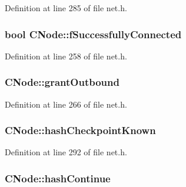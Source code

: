 Definition at line 285 of file net.\+h.

\hypertarget{class_c_node_ab58c1772b2698e348d86002f34254119}{}
\subsubsection[{f\+Successfully\+Connected}]{\setlength{\rightskip}{0pt plus 5cm}bool C\+Node\+::f\+Successfully\+Connected}\label{class_c_node_ab58c1772b2698e348d86002f34254119}


Definition at line 258 of file net.\+h.

\hypertarget{class_c_node_a4bb25f8bdeeaff5e8cb08abc97bbc44d}{}
\subsubsection[{grant\+Outbound}]{ C\+Node\+::grant\+Outbound}\label{class_c_node_a4bb25f8bdeeaff5e8cb08abc97bbc44d}


Definition at line 266 of file net.\+h.

\hypertarget{class_c_node_af1b7e1316a44a8ed4995413366ed6b8a}{}
\subsubsection[{hash\+Checkpoint\+Known}]{ C\+Node\+::hash\+Checkpoint\+Known}\label{class_c_node_af1b7e1316a44a8ed4995413366ed6b8a}


Definition at line 292 of file net.\+h.

\hypertarget{class_c_node_a1a1c0d94de0197c5c4abf5a8d13364f3}{}
\subsubsection[{hash\+Continue}]{ C\+Node\+::hash\+Continue}\label{class_c_node_a1a1c0d94de0197c5c4abf5a8d13364f3}


